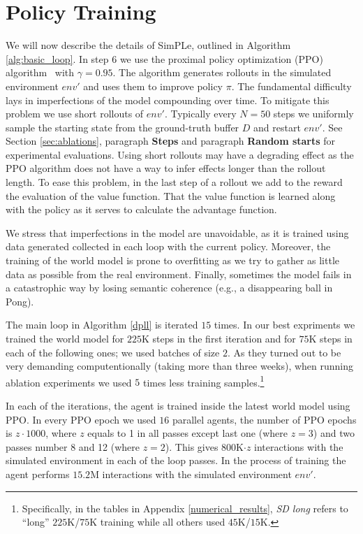 \section{Policy Training} \label{sec:policy_training}
We will now describe the details of SimPLe, outlined in Algorithm \ref{alg:basic_loop}.  In step 6 we use the proximal policy optimization (PPO) algorithm~\cite{ppo} with $\gamma=0.95$. The algorithm generates rollouts in the simulated environment $env'$ and uses them to improve policy $\pi$. The fundamental difficulty lays in imperfections of the model compounding over time. To mitigate this problem we use short rollouts of $env'$. Typically every $N=50$ steps we uniformly sample the starting state from the ground-truth buffer $D$ and restart $env'$. See Section \ref{sec:ablations}, paragraph {\bf Steps} and paragraph {\bf Random starts} for experimental evaluations. Using short rollouts may have a degrading effect as the PPO algorithm does not have a way to infer effects longer than the rollout length. To ease this problem, in the last step of a rollout we add to the reward the evaluation of the value function. That the value function is learned along with the policy as it serves to calculate the advantage function.

We stress that imperfections in the model are unavoidable, as it is trained using data generated collected in each loop with the current policy. Moreover, the training of the world model is prone to overfitting as we try to gather as little data as possible from the real environment. Finally, sometimes the model fails in a catastrophic way by losing semantic coherence (e.g., a disappearing ball in Pong).

The main loop in Algorithm \ref{dpll} is iterated $15$ times. In our best expriments we trained the world model for $225$K steps in the first iteration and for $75$K steps in each of the following ones; we used batches of size $2$. As they turned out to be very demanding computentionally (taking more than three weeks), when running ablation experiments we used $5$ times less training samples.\footnote{Specifically, in the tables in Appendix \ref{numerical_results}, \emph{SD long} refers to ``long'' $225$K/$75$K training while all others used $45$K/$15$K.} 


In each of the iterations, the agent is trained inside the latest world model using PPO. In every PPO epoch we used $16$ parallel agents, the number of PPO epochs is $z\cdot 1000$, where $z$ equals to 1 in all passes except last one (where $z = 3$) and two passes number 8 and 12 (where $z = 2$). This gives $800$K$\cdot z$ interactions with the simulated environment in each of the loop passes. In the process of training the agent performs  $15.2$M interactions with the simulated environment $env'$.
